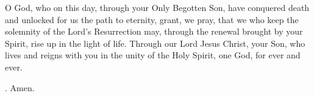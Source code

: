 \lettrine[lines=3]{O}{} God, who on this day,
through your Only Begotten Son,
have conquered death
and unlocked for us the path to eternity,
grant, we pray, that we who keep
the solemnity of the Lord’s Resurrection
may, through the renewal brought by your Spirit,
rise up in the light of life.
Through our Lord Jesus Christ, your Son,
who lives and reigns with you in the unity of the Holy Spirit,
one God, for ever and ever.
\par \Rbar. Amen.
